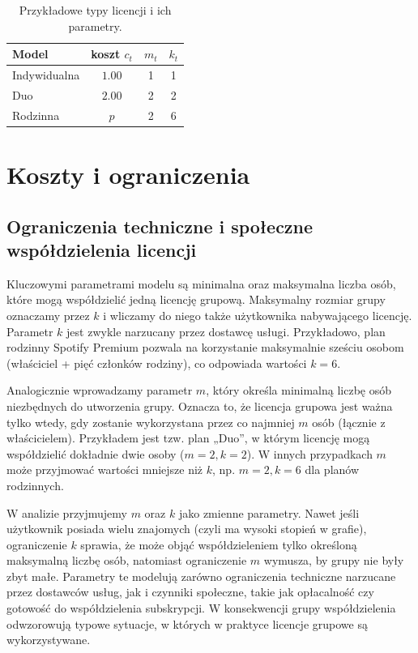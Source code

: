 \begin{table}[h]
\centering
\begin{tabular}{@{}lccc@{}}
\toprule
Model & koszt $c_t$ & $m_t$ & $k_t$ \\
\midrule
Indywidualna & $1.00$ & 1 & 1 \\
Duo          & $2.00$ & 2 & 2 \\
Rodzinna     & $p$    & 2 & 6 \\
\bottomrule
\end{tabular}
\caption{Przykładowe typy licencji i ich parametry.}
\label{tab:license_models}
\end{table}


\section{Koszty i ograniczenia}

\subsection{Ograniczenia techniczne i społeczne współdzielenia licencji}

Kluczowymi parametrami modelu są minimalna oraz maksymalna liczba osób, które mogą współdzielić jedną licencję grupową. Maksymalny rozmiar grupy oznaczamy przez $k$ i wliczamy do niego także użytkownika nabywającego licencję. Parametr $k$ jest zwykle narzucany przez dostawcę usługi. Przykładowo, plan rodzinny Spotify Premium pozwala na korzystanie maksymalnie sześciu osobom (właściciel + pięć członków rodziny), co odpowiada wartości $k=6$.

Analogicznie wprowadzamy parametr $m$, który określa minimalną liczbę osób niezbędnych do utworzenia grupy. Oznacza to, że licencja grupowa jest ważna tylko wtedy, gdy zostanie wykorzystana przez co najmniej $m$ osób (łącznie z właścicielem). Przykładem jest tzw. plan „Duo”, w którym licencję mogą współdzielić dokładnie dwie osoby ($m=2, k=2$). W innych przypadkach $m$ może przyjmować wartości mniejsze niż $k$, np. $m=2, k=6$ dla planów rodzinnych.

W analizie przyjmujemy $m$ oraz $k$ jako zmienne parametry. Nawet jeśli użytkownik posiada wielu znajomych (czyli ma wysoki stopień w grafie), ograniczenie $k$ sprawia, że może objąć współdzieleniem tylko określoną maksymalną liczbę osób, natomiast ograniczenie $m$ wymusza, by grupy nie były zbyt małe. Parametry te modelują zarówno ograniczenia techniczne narzucane przez dostawców usług, jak i czynniki społeczne, takie jak opłacalność czy gotowość do współdzielenia subskrypcji. W konsekwencji grupy współdzielenia odwzorowują typowe sytuacje, w których w praktyce licencje grupowe są wykorzystywane.


